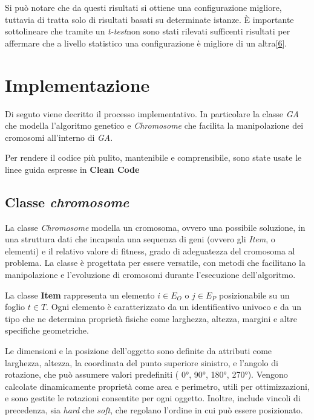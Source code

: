 Si può notare che da questi risultati si ottiene una configurazione migliore, tuttavia di tratta solo di risultati basati su determinate istanze. È importante sottolineare che tramite un \emph{t-test}\glsfirstoccur non sono stati rilevati sufficenti risultati per affermare che a livello statistico una configurazione è migliore di un altra[\hyperlink{bibliografia}{6}]. 

\section{Implementazione}

Di seguto viene decritto il processo implementativo. In particolare la classe \emph{GA} che modella l'algoritmo genetico e \emph{Chromosome} che facilita la manipolazione dei cromosomi all'interno di \emph{GA}.

Per rendere il codice più pulito, mantenibile e comprensibile, sono state usate le linee guida espresse in \textbf{Clean Code}

\subsection{Classe \emph{chromosome}}

La classe \emph{Chromosome} modella un cromosoma, ovvero una possibile soluzione, in una struttura dati che incapsula una sequenza di geni (ovvero gli \emph{Item}, o elementi) e il relativo valore di fitness, grado di adeguatezza del cromosoma al problema. La classe è progettata per essere versatile, con metodi che facilitano la manipolazione e l'evoluzione di cromosomi durante l'esecuzione dell'algoritmo.

La classe \textbf{Item} rappresenta un elemento \( i \in E_O\) o \( j \in E_P\) posizionabile su un foglio \( t \in T \). Ogni elemento è caratterizzato da un identificativo univoco e da un tipo che ne determina proprietà fisiche come larghezza, altezza, margini e altre specifiche geometriche.

Le dimensioni e la posizione dell'oggetto sono definite da attributi come larghezza, altezza, la coordinata del punto superiore sinistro, e l'angolo di rotazione, che può assumere valori predefiniti ( 0°, 90°, 180°, 270°). Vengono calcolate dinamicamente proprietà come area e perimetro, utili per ottimizzazioni, e sono gestite le rotazioni consentite per ogni oggetto. Inoltre, include vincoli di precedenza, sia \emph{hard} che \emph{soft}, che regolano l'ordine in cui può essere posizionato.


